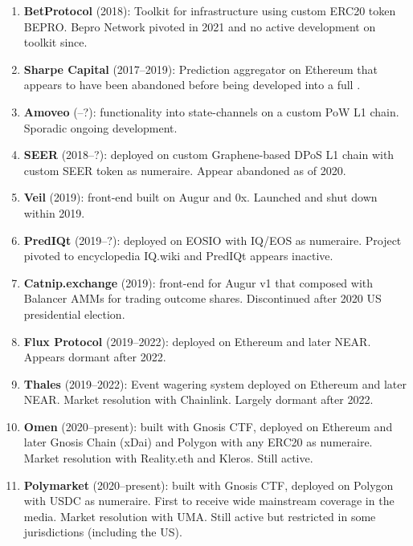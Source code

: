\begin{enumerate}
\item \textbf{BetProtocol} (2018): Toolkit for \depm infrastructure using custom ERC20 token BEPRO. Bepro Network pivoted in 2021 and no active development on toolkit since.

\item \textbf{Sharpe Capital} (2017--2019): Prediction aggregator on Ethereum that appears to have been abandoned before being developed into a full \depm.

\item \textbf{Amoveo} (--?): \depm functionality into state-channels on a custom PoW L1 chain. Sporadic ongoing development.

\item \textbf{SEER} (2018--?): \depm deployed on custom Graphene-based DPoS L1 chain with custom SEER token as numeraire. Appear abandoned as of 2020.

\item \textbf{Veil} (2019): \depm front-end built on Augur and 0x. Launched and shut down within 2019.

\item \textbf{PredIQt} (2019--?): \depm deployed on EOSIO with IQ/EOS as numeraire. Project pivoted to encyclopedia IQ.wiki and PredIQt appears inactive.

\item \textbf{Catnip.exchange} (2019): \depm front-end for Augur v1 that composed with Balancer AMMs for trading outcome shares. Discontinued after 2020 US presidential election.

\item \textbf{Flux Protocol} (2019--2022): \depm deployed on Ethereum and later NEAR. Appears dormant after 2022. 

\item \textbf{Thales} (2019--2022): Event wagering system deployed on Ethereum and later NEAR. Market resolution with Chainlink. Largely dormant after 2022.

\item \textbf{Omen} (2020--present): \depm built with Gnosis CTF, deployed on Ethereum and later Gnosis Chain (xDai) and Polygon with any ERC20 as numeraire. Market resolution with Reality.eth and Kleros. Still active.

\item \textbf{Polymarket} (2020--present): \depm built with Gnosis CTF, deployed on Polygon with USDC as numeraire. First \depm to receive wide mainstream coverage in the media. Market resolution with UMA. Still active but restricted in some jurisdictions (including the US). 


\end{enumerate}
